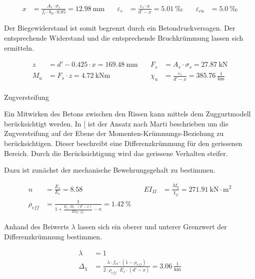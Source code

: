 \documentclass[
  11pt,
  letterpaper,
]{scrreprt}
\makeatletter
\let\oldparagraph\paragraph
\renewcommand{\paragraph}{
    \@ifstar
      \xxxParagraphStar
      \xxxParagraphNoStar
  }
\newcommand{\xxxParagraphStar}[1]{\oldparagraph*{#1}\mbox{}}
\newcommand{\xxxParagraphNoStar}[1]{\oldparagraph{#1}\mbox{}}
\makeatother
\begin{document}
\[
\begin{aligned}
x& = \frac{A_{s} \cdot \sigma_{s}}{f_{c} \cdot b_{w} \cdot 0.85} = 12.98 \ \mathrm{mm} \quad & \varepsilon_{c}& = \frac{\varepsilon_{s} \cdot x}{{d}' - x} = 5.01 \ \mathrm{‰} \quad & \varepsilon_{cu}& = 5.0 \ \mathrm{‰} \end{aligned}
\]

Der Biegewiderstand ist somit begrenzt durch ein Betondruckversagen. Der
entsprechende Widerstand und die entsprechende Bruchkrümmung lassen sich
ermitteln.

\[
\begin{aligned}
z& = {d}' - 0.425 \cdot x = 169.48 \ \mathrm{mm} \quad & F_{s}& = A_{s} \cdot \sigma_{s} = 27.87 \ \mathrm{kN} \\ 
M_{u}& = F_{s} \cdot z = 4.72 \ \mathrm{kNm} \quad & \chi_{u}& = \frac{\varepsilon_{s}}{{d}' - x} = 385.76 \ \frac{1}{\mathrm{km}} \end{aligned}
\]

\paragraph{Zugversteifung}\label{zugversteifung}

Ein Mitwirken des Betons zwischen den Rissen kann mittels dem
Zuggurtmodell berücksichtigt werden. In
{[}\citeproc{ref-spathelf_gebrauchstauglichkeit_2022}{6}{]} ist der
Ansatz nach Marti beschrieben um die Zugversteifung auf der Ebene der
Momenten-Krümmungs-Beziehung zu berücksichtigen. Dieser beschreibt eine
Differenzkrümmung für den gerissenen Bereich. Durch die Berücksichtigung
wird das gerissene Verhalten steifer.

Dazu ist zunächst der mechanische Bewehrungsgehalt zu bestimmen.

\[
\begin{aligned}
n& = \frac{E_{s}}{E_{c}} = 8.58 \  \quad & EI_{II}& = \frac{M_{y}}{\chi_{y}} = 271.91 \ \mathrm{kN} \cdot \mathrm{m}^{2} \\ 
\rho_{eff}& = \frac{1}{1 + \frac{E_{s} \cdot M_{r} \cdot \left({d}' - x\right)}{EI_{II} \cdot f_{ct}} - n} = 1.42 \ \mathrm{\%} \quad &  
 \end{aligned}
\]

Anhand des Beiwerts \(\lambda\) lassen sich ein oberer und unterer
Grenzwert der Differenzkrümmung bestimmen.

\[
\begin{aligned}
\lambda& = 1 \\ 
\Delta_{\chi}& = \frac{\lambda \cdot f_{ct} \cdot \left(1 - \rho_{eff}\right)}{2 \cdot \rho_{eff} \cdot E_{s} \cdot \left({d}' - x\right)} = 3.06 \ \frac{1}{\mathrm{km}} \end{aligned}
\]
\end{document}
